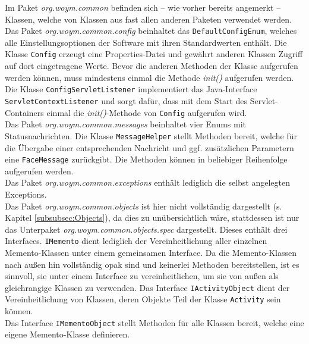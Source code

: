 \documentclass[fontsize=12pt,paper=a4,twoside]{scrartcl}
\begin{document}
Im Paket \textit{org.woym.common} befinden sich -- wie vorher bereits angemerkt -- Klassen, welche von Klassen aus fast allen anderen Paketen verwendet werden.\\
Das Paket \textit{org.woym.common.config} beinhaltet das \texttt{DefaultConfigEnum}, welches alle Einstellungsoptionen der Software mit ihren Standardwerten enthält. Die Klasse \texttt{Config} erzeugt eine Properties-Datei und gewährt anderen Klassen Zugriff auf dort eingetragene Werte. Bevor die anderen Methoden der Klasse aufgerufen werden können, muss mindestens einmal die Methode \textit{init()} aufgerufen werden. 
\\
Die Klasse \texttt{ConfigServletListener} implementiert das Java-Interface \texttt{ServletContextListener} und sorgt dafür, dass mit dem Start des Servlet-Containers einmal die \textit{init()}-Methode von \texttt{Config} aufgerufen wird.\\

Das Paket \textit{org.woym.common.messages} beinhaltet vier Enums mit Statusnachrichten. Die Klasse \texttt{MessageHelper} stellt Methoden bereit, welche für die Übergabe einer entsprechenden Nachricht und ggf. zusätzlichen Parametern eine \texttt{FaceMessage} zurückgibt. Die Methoden können in beliebiger Reihenfolge aufgerufen werden.\\

Das Paket \textit{org.woym.common.exceptions} enthält lediglich die selbst angelegten Exceptions. \\

Das Paket \textit{org.woym.common.objects} ist hier nicht vollständig dargestellt (s. Kapitel \ref{subsubsec:Objects}), da dies zu unübersichtlich wäre, stattdessen ist nur das Unterpaket \textit{org.woym.common.objects.spec} dargestellt. Dieses enthält drei Interfaces. \texttt{IMemento} dient lediglich der Vereinheitlichung aller einzelnen Memento-Klassen unter einem gemeinsamen Interface. Da die Memento-Klassen nach außen hin vollständig opak sind und keinerlei Methoden bereitstellen, ist es sinnvoll, sie unter einem Interface zu vereinheitlichen, um sie von außen als gleichrangige Klassen zu verwenden. Das Interface \texttt{IActivityObject} dient der Vereinheitlichung von Klassen, deren Objekte Teil der Klasse \texttt{Activity} sein können. \\
Das Interface \texttt{IMementoObject} stellt Methoden für alle Klassen bereit, welche eine eigene Memento-Klasse definieren.\clearpage
\end{document}

